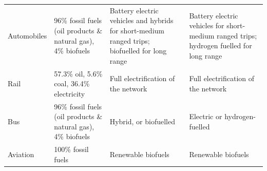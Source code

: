 \begin{landscape}
{\begin{longtable}{p{3cm}p{5cm}p{5cm}p{5cm}}
Automobiles & 96\% fossil fuels (oil products \& natural gas), 4\% biofuels \parencite{iea2017_Statisticswebportal} & Battery electric vehicles and hybrids for short-medium ranged trips; biofuelled for long range & Battery electric vehicles for short-medium ranged trips; hydrogen fuelled for long range \\*
Rail & 57.3\% oil, 5.6\% coal, 36.4\% electricity \parencite{cazzola2016_RailwayHandbook2016} & Full electrification of the network & Full electrification of the network \\*
Bus & 96\% fossil fuels (oil products \& natural gas), 4\% biofuels \parencite{iea2017_Statisticswebportal} & Hybrid, or biofuelled & Electric or hydrogen-fuelled \\*
Aviation & 100\% fossil fuels \parencite{iea2017_Statisticswebportal} & Renewable biofuels & Renewable biofuels
\end{longtable}
}
\end{landscape}

